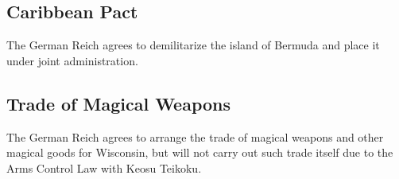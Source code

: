 \documentclass{article}
\begin{document}
\subsection{Caribbean Pact}
The German Reich agrees to demilitarize the island of Bermuda and place it under joint administration.

\subsection{Trade of Magical Weapons}
The German Reich agrees to arrange the trade of magical weapons and other magical goods for Wisconsin, but will not carry out such trade itself due to the Arms Control Law with Keosu Teikoku.
\end{document}
